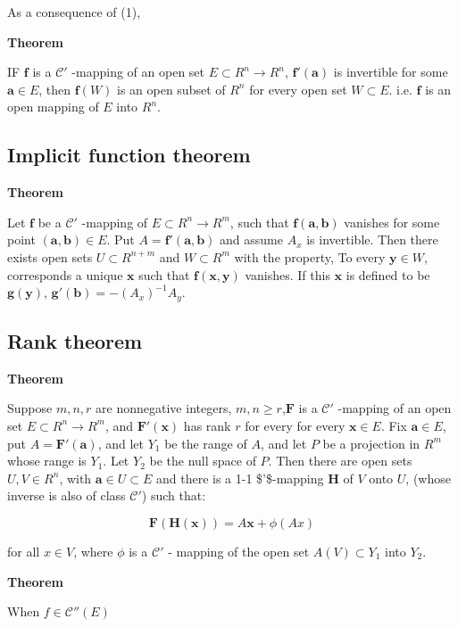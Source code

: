 \documentclass[11pt]{article}
\begin{document}
As a consequence of (1),

\textbf{Theorem}

IF \(\bm{f}\) is a \(\mathcal{C}'\) -mapping of an open set \(E \subset R^n \to R^n\), \(\bm{f'(a)}\) is invertible for some \(\bm{a} \in E\), then \(\bm{f}(W)\) is an open subset of \(R^n\) for every open set \(W \subset E\). i.e. \(\bm{f}\) is an open mapping of \(E\) into \(R^n\).

\subsection{Implicit function theorem}
\label{sec:orga8b96a4}


\textbf{Theorem}

Let \(\bm{f}\) be a \(\mathcal{C}'\) -mapping of \(E \subset R^n \to R^m\), such that \(\bm{f(a,b)}\) vanishes for some point \(\bm{(a,b)} \in E\). Put \(A = \bm{f'(a,b)}\) and assume \(A_x\) is invertible. Then there exists open sets \(U \subset R^{n+m}\) and \(W \subset R^m\) with the property, To every \(\bm{y}\in W\), corresponds a unique \(\bm{x}\) such that \(\bm{f}(\bm{x,y})\) vanishes. If this \(\bm{x}\) is defined to be \(\bm{g(y)}\), \(\bm{g'(b)} = -(A_x)^{-1}A_y\).

\subsection{Rank theorem}
\label{sec:org6f424ba}

\textbf{Theorem}

Suppose \(m,n,r\) are nonnegative integers, \(m,n \geq r\),\(\bm{F}\) is a \(\mathcal{C}'\) -mapping of an open set \(E \subset R^n \to R^m\), and \(\bm{F'(x)}\) has rank \(r\) for every for every \(\bm{x}\in E\). Fix \(\bm{a}\in E\), put \(A = \bm{F'(a)}\), and let \(Y_1\) be the range of \(A\), and let \(P\) be a projection in \(R^m\) whose range is \(Y_1\). Let \(Y_2\) be the null space of \(P\).
Then there are open sets \(U,V \in R^n\), with \(\bm{a} \in U \subset E\) and there is a 1-1 \$'\$-mapping \(\bm{H}\) of \(V\) onto \(U\), (whose inverse is also of class \(\mathcal{C}'\)) such that:

\[
\bm{F(H(x))} = A\bm{x} + \phi(Ax)
\]

for all \(x\in V\), where \(\phi\) is a \(\mathcal{C}'\) - mapping of the open set \(A(V) \subset Y_1\) into \(Y_2\).

\textbf{Theorem}

When \(f \in \mathcal{C}''(E)\)
\end{document}
